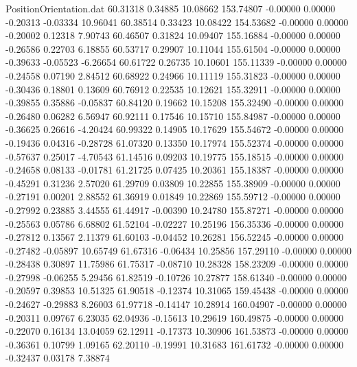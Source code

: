 \begin{filecontents}{PositionOrientation.dat}
  60.31318    0.34885   10.08662   153.74807   -0.00000    0.00000   -0.20313   -0.03334   10.96041
  60.38514    0.33423   10.08422   154.53682   -0.00000    0.00000   -0.20002    0.12318    7.90743
  60.46507    0.31824   10.09407   155.16884   -0.00000    0.00000   -0.26586    0.22703    6.18855
  60.53717    0.29907   10.11044   155.61504   -0.00000    0.00000   -0.39633   -0.05523   -6.26654
  60.61722    0.26735   10.10601   155.11339   -0.00000    0.00000   -0.24558    0.07190    2.84512
  60.68922    0.24966   10.11119   155.31823   -0.00000    0.00000   -0.30436    0.18801    0.13609
  60.76912    0.22535   10.12621   155.32911   -0.00000    0.00000   -0.39855    0.35886   -0.05837
  60.84120    0.19662   10.15208   155.32490   -0.00000    0.00000   -0.26480    0.06282    6.56947
  60.92111    0.17546   10.15710   155.84987   -0.00000    0.00000   -0.36625    0.26616   -4.20424
  60.99322    0.14905   10.17629   155.54672   -0.00000    0.00000   -0.19436    0.04316   -0.28728
  61.07320    0.13350   10.17974   155.52374   -0.00000    0.00000   -0.57637    0.25017   -4.70543
  61.14516    0.09203   10.19775   155.18515   -0.00000    0.00000   -0.24658    0.08133   -0.01781
  61.21725    0.07425   10.20361   155.18387   -0.00000    0.00000   -0.45291    0.31236    2.57020
  61.29709    0.03809   10.22855   155.38909   -0.00000    0.00000   -0.27191    0.00201    2.88552
  61.36919    0.01849   10.22869   155.59712   -0.00000    0.00000   -0.27992    0.23885    3.44555
  61.44917   -0.00390   10.24780   155.87271   -0.00000    0.00000   -0.25563    0.05786    6.68802
  61.52104   -0.02227   10.25196   156.35336   -0.00000    0.00000   -0.27812    0.13567    2.11379
  61.60103   -0.04452   10.26281   156.52245   -0.00000    0.00000   -0.27482   -0.05897   10.65749
  61.67316   -0.06434   10.25856   157.29110   -0.00000    0.00000   -0.28438    0.30897   11.75986
  61.75317   -0.08710   10.28328   158.23209   -0.00000    0.00000   -0.27998   -0.06255    5.29456
  61.82519   -0.10726   10.27877   158.61340   -0.00000    0.00000   -0.20597    0.39853   10.51325
  61.90518   -0.12374   10.31065   159.45438   -0.00000    0.00000   -0.24627   -0.29883    8.26003
  61.97718   -0.14147   10.28914   160.04907   -0.00000    0.00000   -0.20311    0.09767    6.23035
  62.04936   -0.15613   10.29619   160.49875   -0.00000    0.00000   -0.22070    0.16134   13.04059
  62.12911   -0.17373   10.30906   161.53873   -0.00000    0.00000   -0.36361    0.10799    1.09165
  62.20110   -0.19991   10.31683   161.61732   -0.00000    0.00000   -0.32437    0.03178    7.38874

\end{filecontents}
